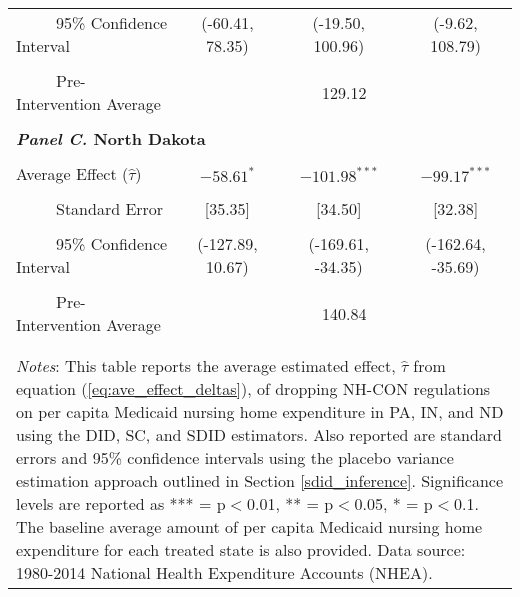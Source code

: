 \documentclass[../Main.tex]{subfiles}
\begin{document}
\begin{table}[htbp]
\begin{tabular}{l*{3}{c}}
\multicolumn{1}{l}{\ \ \ \ \ 95\% Confidence Interval}&   \multicolumn{1}{c}{(-60.41, 78.35)}&   \multicolumn{1}{c}{(-19.50, 100.96)}&   \multicolumn{1}{c}{(-9.62, 108.79)}\\
\\[-2ex]
\multicolumn{1}{l}{\ \ \ \ \ Pre-Intervention Average}&   \multicolumn{3}{c}{129.12}\\
\\[-.1ex]
\multicolumn{4}{l}{\textbf{\textit{Panel C.} North Dakota}}\\
\\[-1.5ex]
\multicolumn{1}{l}{Average Effect ($\hat{\tau}$)}&   \multicolumn{1}{c}{$-58.61^{*}$}&   \multicolumn{1}{c}{$-101.98^{***}$}&  \multicolumn{1}{c}{$-99.17^{***}$}\\
\\[-2ex]
\multicolumn{1}{l}{\ \ \ \ \ Standard Error}  &\multicolumn{1}{c}{[35.35]}&\multicolumn{1}{c}{[34.50]}&\multicolumn{1}{c}{[32.38]}\\
\\[-2ex]
\multicolumn{1}{l}{\ \ \ \ \ 95\% Confidence Interval}&   \multicolumn{1}{c}{(-127.89, 10.67)}&   \multicolumn{1}{c}{(-169.61, -34.35)}&   \multicolumn{1}{c}{(-162.64, -35.69)}\\
\\[-2ex]
\multicolumn{1}{l}{\ \ \ \ \ Pre-Intervention Average}&   \multicolumn{3}{c}{140.84}\\
\\[-.1ex]
\hline\hline
\\[-2ex]
\multicolumn{4}{p{.8\linewidth}}{\footnotesize \textit{Notes}: This table reports the average estimated effect, $\hat{\tau}$ from equation (\ref{eq:ave_effect_deltas}), of dropping NH-CON regulations on per capita Medicaid nursing home expenditure in PA, IN, and ND using the DID, SC, and SDID estimators. Also reported are standard errors and 95\% confidence intervals using the placebo variance estimation approach outlined in Section \ref{sdid_inference}. Significance levels are reported as *** = p$<$0.01, ** = p$<$0.05, * = p$<$0.1. The baseline average amount of per capita Medicaid nursing home expenditure for each treated state is also provided. Data source: 1980-2014 National Health Expenditure Accounts (NHEA).}
\end{tabular}
\end{table}
\vfill
\clearpage
\end{document}

